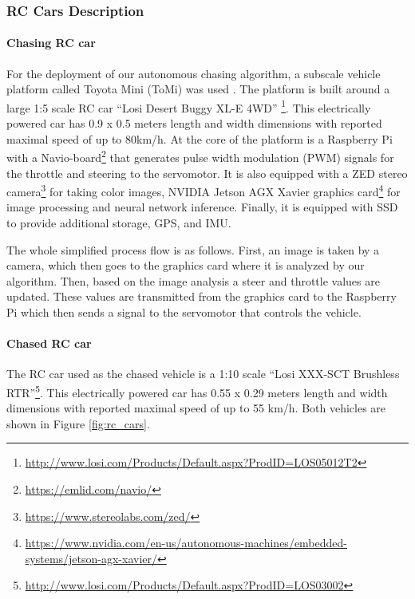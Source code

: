 \documentclass{ctuthesis/ctuthesis}
\begin{document}
\subsubsection{RC Cars Description}
\paragraph{Chasing RC car}
For the deployment of our autonomous chasing algorithm, a subscale vehicle platform called Toyota Mini (ToMi) was used \cite{tomi_Cech2020}. The platform is built around a large 1:5 scale RC car ``Losi Desert Buggy XL-E 4WD'' \footnote{\href{http://www.losi.com/Products/Default.aspx?ProdID=LOS05012T2}{http://www.losi.com/Products/Default.aspx?ProdID=LOS05012T2}}. This electrically powered car has 0.9 x 0.5 meters length and width dimensions with reported maximal speed of up to 80km/h. At the core of the platform is a Raspberry Pi with a Navio-board\footnote{\href{https://emlid.com/navio/}{https://emlid.com/navio/}} that generates pulse width modulation (PWM) signals for the throttle and steering to the servomotor. It is also equipped with a ZED stereo camera\footnote{\href{https://www.stereolabs.com/zed/}{https://www.stereolabs.com/zed/}} for taking color images, NVIDIA Jetson AGX Xavier graphics card\footnote{\href{https://www.nvidia.com/en-us/autonomous-machines/embedded-systems/jetson-agx-xavier/}{https://www.nvidia.com/en-us/autonomous-machines/embedded-systems/jetson-agx-xavier/}} for image processing and neural network inference. Finally, it is equipped with SSD to provide additional storage, GPS, and IMU. \par
The whole simplified process flow is as follows. First, an image is taken by a camera, which then goes to the graphics card where it is analyzed by our algorithm. Then, based on the image analysis a steer and throttle values are updated. These values are transmitted from the graphics card to the Raspberry Pi which then sends a signal to the servomotor that controls the vehicle.

\paragraph{Chased RC car}
The RC car used as the chased vehicle is a 1:10 scale ``Losi XXX-SCT Brushless RTR''\footnote{\href{http://www.losi.com/Products/Default.aspx?ProdID=LOS03002}{http://www.losi.com/Products/Default.aspx?ProdID=LOS03002}}. This electrically powered car has 0.55 x 0.29 meters length and width dimensions with reported maximal speed of up to 55 km/h. Both vehicles are shown in Figure \ref{fig:rc_cars}.
\end{document}

